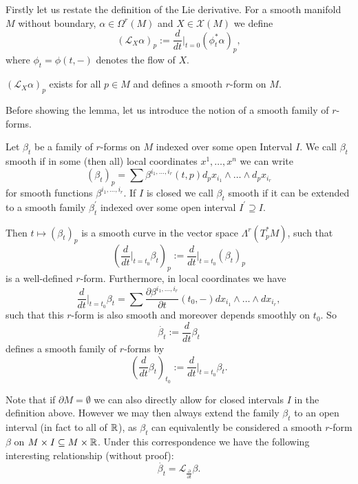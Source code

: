 Firstly let us restate the definition of the Lie derivative. For a smooth manifold $M$ without boundary, $\alpha \in \Omega^r(M)$ and $X \in \mathscr{X}(M)$ we define
\[
(\mathcal{L}_X \alpha)_p := \frac{d}{dt}\bigg|_{t=0} (\phi_t^\ast \alpha)_p,
\]
where $\phi_t = \phi(t,-)$ denotes the flow of $X$.

\begin{lemma}
    \label{lem:well_definedness_Lie_derivative}
    $(\mathcal{L}_X\alpha)_p$ exists for all $p\in M$ and defines a smooth $r$-form on $M$.
\end{lemma}

Before showing the lemma, let us introduce the notion of a smooth family of $r$-forms.

\begin{definition}
    Let $\beta_t$ be a family of $r$-forms on $M$ indexed over some open Interval $I$. We call $\beta_t$ smooth if in some (then all) local coordinates $x^1,\ldots,x^n$ we can write
    \[
    (\beta_t)_p = \sum \beta^{i_1,\ldots,i_r}(t,p)d_px_{i_1} \wedge \ldots \wedge d_px_{i_r}
    \]
    for smooth functions $\beta^{i_1,\ldots,i_r}$. If $I$ is closed we call $\beta_t$ smooth if it can be extended to a smooth family $\beta^\prime_t$ indexed over some open interval $I^\prime \supseteq I$.
\end{definition}

\noindent Then $t \mapsto (\beta_t)_p$ is a smooth curve in the vector space $\Lambda^r(T_p^\ast M)$, such that 
\[
\left(\frac{d}{dt}\bigg|_{t=t_0} \beta_t\right)_p := \frac{d}{dt}\bigg|_{t=t_0} (\beta_t)_p
\]
is a well-defined $r$-form. Furthermore, in local coordinates we have
\[
    \frac{d}{dt}\bigg|_{t=t_0} \beta_t = \sum \frac{\partial\beta^{i_1,\ldots,i_r}}{\partial t}(t_0,-)dx_{i_1} \wedge \ldots \wedge dx_{i_r},
\]
such that this $r$-form is also smooth and moreover depends smoothly on $t_0$. So 
\[
\dot{\beta_t} := \frac{d}{dt}\beta_t
\]
defines a smooth family of $r$-forms by
\[
\left(\frac{d}{dt}\beta_t\right)_{t_0} := \frac{d}{dt}\bigg|_{t=t_0} \beta_t.
\]

Note that if $\partial M = \emptyset$ we can also directly allow for closed intervals $I$ in the definition above. However we may then always extend the family $\beta_t$ to an open interval (in fact to all of $\mathbb{R}$), as $\beta_t$ can equivalently be considered a smooth $r$-form $\beta$ on $M \times I \subseteq M \times \mathbb{R}$. Under this correspondence we have the following interesting relationship (without proof):
\[
\dot{\beta_t} = \mathcal{L}_{\frac{\partial}{\partial t}}\beta.
\]


